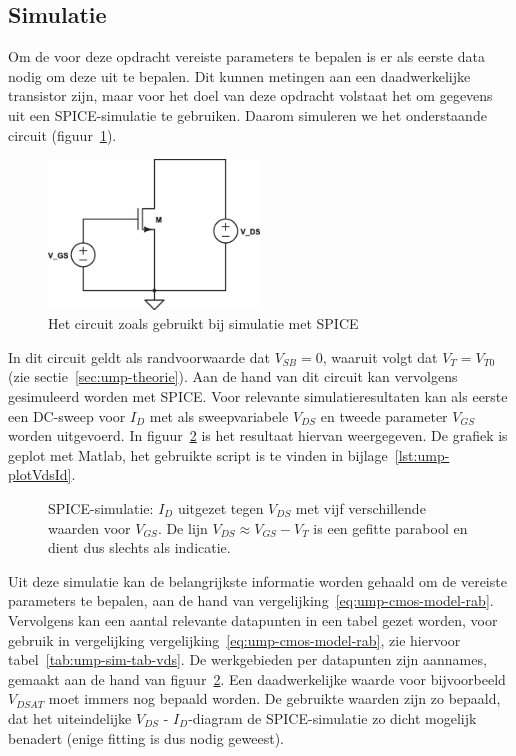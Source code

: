 \documentclass{scrartcl}
\begin{document}
\subsection{Simulatie}
\label{subsec:ump-methode-sim}

Om de voor deze opdracht vereiste parameters te bepalen is er als eerste data nodig om deze uit te bepalen. Dit kunnen metingen aan een daadwerkelijke transistor zijn, maar voor het doel van deze opdracht volstaat het om gegevens uit een SPICE-simulatie te gebruiken. Daarom simuleren we het onderstaande circuit (figuur~\ref{fig:ump-sim-circuit}).

\begin{figure}[H]
	\centering
	\includegraphics[width=0.5\textwidth]{resource/sim-circuit}
	\caption{Het circuit zoals gebruikt bij simulatie met SPICE}
	\label{fig:ump-sim-circuit}
\end{figure}

In dit circuit geldt als randvoorwaarde dat $V_{SB} = 0$, waaruit volgt dat $V_{T} = V_{T0}$ (zie sectie~\ref{sec:ump-theorie}).
Aan de hand van dit circuit kan vervolgens gesimuleerd worden met SPICE. Voor relevante simulatieresultaten kan als eerste een DC-sweep voor $I_{D}$ met als sweepvariabele $V_{DS}$ en tweede parameter $V_{GS}$ worden uitgevoerd. In figuur~\ref{fig:ump-sim-fig-vds} is het resultaat hiervan weergegeven. De grafiek is geplot met Matlab, het gebruikte script is te vinden in bijlage~\ref{lst:ump-plotVdsId}.
	
\begin{figure}[H]
	\centering
	\setlength{} 
	\setlength{}
	
	\caption{SPICE-simulatie: $I_{D}$ uitgezet tegen $V_{DS}$ met vijf verschillende waarden voor $V_{GS}$. De lijn $V_{DS} \approx V_{GS} - V_{T}$ is een gefitte parabool en dient dus slechts als indicatie.}
	\label{fig:ump-sim-fig-vds}
\end{figure}

Uit deze simulatie kan de belangrijkste informatie worden gehaald om de vereiste parameters te bepalen, aan de hand van vergelijking~\ref{eq:ump-cmos-model-rab}. Vervolgens kan een aantal relevante datapunten in een tabel gezet worden, voor gebruik in vergelijking vergelijking~\ref{eq:ump-cmos-model-rab}, zie hiervoor tabel~\ref{tab:ump-sim-tab-vds}. De werkgebieden per datapunten zijn aannames, gemaakt aan de hand van figuur~\ref{fig:ump-sim-fig-vds}. Een daadwerkelijke waarde voor bijvoorbeeld $V_{DSAT}$ moet immers nog bepaald worden. De gebruikte waarden zijn zo bepaald, dat het uiteindelijke $V_{DS}$ - $I_{D}$-diagram de SPICE-simulatie zo dicht mogelijk benadert (enige fitting is dus nodig geweest).
\end{document}
